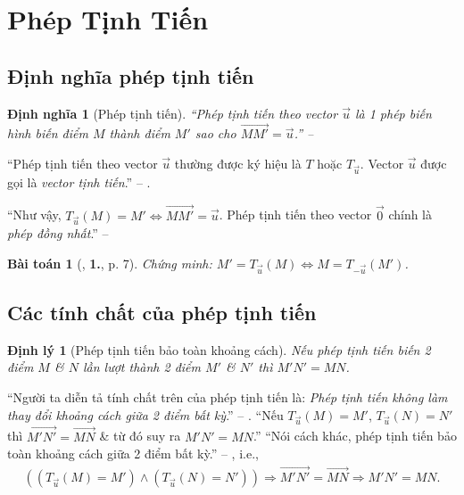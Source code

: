 \documentclass[oneside]{book}
\numberwithin{equation}{section}
\newtheorem{dinhnghia}{Định nghĩa}[section]
\newtheorem{baitoan}{Bài toán}[section]
\newtheorem{dinhly}{Định lý}[section]
\begin{document}

\section{Phép Tịnh Tiến}

\subsection{Định nghĩa phép tịnh tiến}

\begin{dinhnghia}[Phép tịnh tiến]
	``\emph{Phép tịnh tiến} theo vector $\vec{u}$ là 1 phép biến hình biến điểm $M$ thành điểm $M'$ sao cho $\overrightarrow{MM'} = \vec{u}$.'' -- \cite[p. 5]{SGK_Toan_11_hinh_hoc_nang_cao}
\end{dinhnghia}
``Phép tịnh tiến theo vector $\vec{u}$ thường được ký hiệu là $T$ hoặc $T_{\vec{u}}$. Vector $\vec{u}$ được gọi là \textit{vector tịnh tiến}.'' -- \cite[p. 5]{SGK_Toan_11_hinh_hoc_nang_cao}.

``Như vậy, $T_{\vec{u}}(M) = M'\Leftrightarrow\overrightarrow{MM'} = \vec{u}$. Phép tịnh tiến theo vector $\vec{0}$ chính là \textit{phép đồng nhất}.'' -- \cite[p. 5]{SGK_Toan_11_hinh_hoc_co_ban}

\begin{baitoan}[\cite{SGK_Toan_11_dai_so_giai_tich_co_ban}, \textbf{1.}, p. 7]
	\label{prob:phep tinh tien}
	Chứng minh: $M' = T_{\vec{u}}(M)\Leftrightarrow M = T_{-\vec{u}}(M')$.
\end{baitoan}

\subsection{Các tính chất của phép tịnh tiến}

\begin{dinhly}[Phép tịnh tiến bảo toàn khoảng cách]
	\label{thm:phep tinh tien bao toan khoang cach}
	Nếu phép tịnh tiến biến 2 điểm $M$ \& $N$ lần lượt thành 2 điểm $M'$ \& $N'$ thì $M'N' = MN$.
\end{dinhly}
``Người ta diễn tả tính chất trên của phép tịnh tiến là: \textit{Phép tịnh tiến không làm thay đổi khoảng cách giữa 2 điểm bất kỳ}.'' -- \cite[p. 6]{SGK_Toan_11_hinh_hoc_nang_cao}. ``Nếu $T_{\vec{u}}(M) = M'$, $T_{\vec{u}}(N) = N'$ thì $\overrightarrow{M'N'} = \overrightarrow{MN}$ \& từ đó suy ra $M'N' = MN$.'' ``Nói cách khác, phép tịnh tiến bảo toàn khoảng cách giữa 2 điểm bất kỳ.'' -- \cite[p. 6]{SGK_Toan_11_hinh_hoc_co_ban}, i.e.,
\begin{align}
	\label{phep tinh tien bao toan khoang cach}
	((T_{\vec{u}}(M) = M')\land(T_{\vec{u}}(N) = N'))\Rightarrow\overrightarrow{M'N'} = \overrightarrow{MN}\Rightarrow M'N' = MN.
\end{align}
\end{document}
